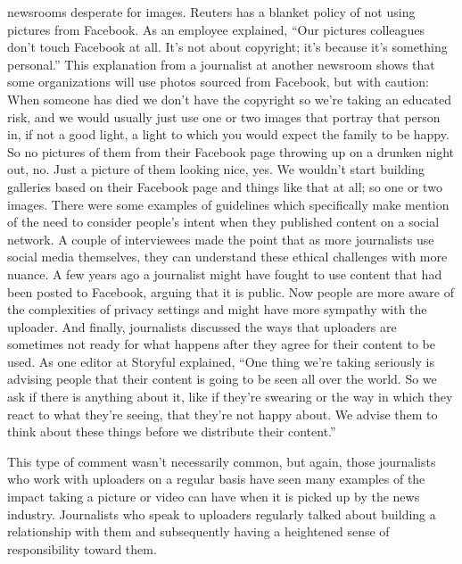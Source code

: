 \begin{enumerate}
newsrooms desperate for images. Reuters has a blanket policy of not using
pictures from Facebook. As an employee explained, ``Our pictures colleagues
don't touch Facebook at all. It's not about copyright; it's because it's
something personal.''
This explanation from a journalist at another newsroom shows that some
organizations will use photos sourced from Facebook, but with caution:
When someone has died we don't have the copyright so we're taking
an educated risk, and we would usually just use one or two images
that portray that person in, if not a good light, a light to which you
would expect the family to be happy. So no pictures of them from
their Facebook page throwing up on a drunken night out, no. Just a
picture of them looking nice, yes. We wouldn't start building galleries
based on their Facebook page and things like that at all; so one or
two images.
There were some examples of guidelines which specifically make mention
of the need to consider people's intent when they published content on a
social network. A couple of interviewees made the point that as more journalists
use social media themselves, they can understand these ethical challenges
with more nuance. A few years ago a journalist might have fought to
use content that had been posted to Facebook, arguing that it is public. Now
people are more aware of the complexities of privacy settings and might
have more sympathy with the uploader.
And finally, journalists discussed the ways that uploaders are sometimes not
ready for what happens after they agree for their content to be used. As one
editor at Storyful explained, ``One thing we're taking seriously is advising
people that their content is going to be seen all over the world. So we ask if
there is anything about it, like if they're swearing or the way in which they
react to what they're seeing, that they're not happy about. We advise them
to think about these things before we distribute their content.''

This type of comment wasn't necessarily common, but again, those journalists
who work with uploaders on a regular basis have seen many examples
of the impact taking a picture or video can have when it is picked up by the
news industry. Journalists who speak to uploaders regularly talked about
building a relationship with them and subsequently having a heightened
sense of responsibility toward them.

\end{enumerate}
